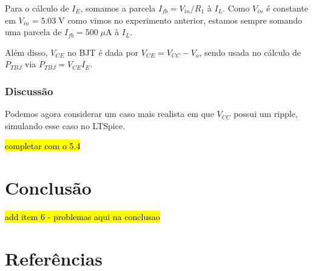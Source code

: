 \documentclass[
	12pt,				%
	oneside,			%
	a4paper,			%
	chapter=TITLE,
	sumario=tradicional,
	english,			%
	brazil				%
]{abntex2}
\newcommand{\un}[1]{\;\text{#1}}
\begin{document}
Para o cálculo de $I_E$, somamos a parcela $I_{fb} = V_{in} / R_1$ à $I_L$. Como
$V_{in}$ é constante em $V_{in} = 5.03 \un{V}$ como vimos no experimento anterior, 
estamos sempre somando uma parcela de $I_{fb} = 500 \un{$\mu$A}$ à $I_L$.

Além disso, $V_{CE}$ no BJT é dada por $V_{CE} = V_{CC} - V_o$, sendo usada no cálculo 
de $P_{TBJ}$ via $P_{TBJ} = V_{CE} I_E$. 

\subsection{Discussão}

Podemos agora considerar um caso mais realista em que $V_{CC}$ possui um ripple, simulando
esse caso no LTSpice.

\hl{completar com o 5.4}


\chapter{Conclusão}\label{cap:conclusao} 

\hl{add item 6 - problemas aqui na conclusao}

\chapter{Referências}\label{cap:referencias} 

\lipsum[1-2]
\end{document}
